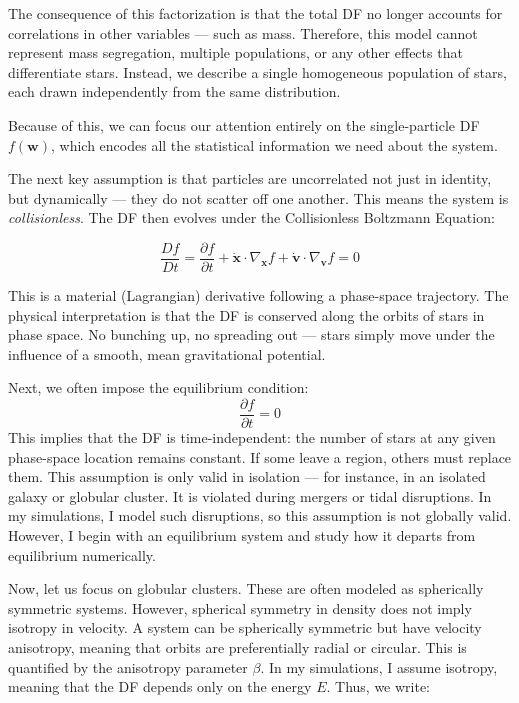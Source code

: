         The consequence of this factorization is that the total DF no longer accounts for correlations in other variables — such as mass. Therefore, this model cannot represent mass segregation, multiple populations, or any other effects that differentiate stars. Instead, we describe a single homogeneous population of stars, each drawn independently from the same distribution.

        Because of this, we can focus our attention entirely on the single-particle DF \( f(\mathbf{w}) \), which encodes all the statistical information we need about the system.

        The next key assumption is that particles are uncorrelated not just in identity, but dynamically — they do not scatter off one another. This means the system is \textit{collisionless}. The DF then evolves under the Collisionless Boltzmann Equation:

        \begin{equation}
        \frac{Df}{Dt} = \frac{\partial f}{\partial t} + \dot{\mathbf{x}} \cdot \nabla_{\mathbf{x}} f + \dot{\mathbf{v}} \cdot \nabla_{\mathbf{v}} f = 0
        \end{equation}

        This is a material (Lagrangian) derivative following a phase-space trajectory. The physical interpretation is that the DF is conserved along the orbits of stars in phase space. No bunching up, no spreading out — stars simply move under the influence of a smooth, mean gravitational potential.

        Next, we often impose the equilibrium condition:
        \[
        \frac{\partial f}{\partial t} = 0
        \]
        This implies that the DF is time-independent: the number of stars at any given phase-space location remains constant. If some leave a region, others must replace them. This assumption is only valid in isolation — for instance, in an isolated galaxy or globular cluster. It is violated during mergers or tidal disruptions. In my simulations, I model such disruptions, so this assumption is not globally valid. However, I begin with an equilibrium system and study how it departs from equilibrium numerically.

        Now, let us focus on globular clusters. These are often modeled as spherically symmetric systems. However, spherical symmetry in density does not imply isotropy in velocity. A system can be spherically symmetric but have velocity anisotropy, meaning that orbits are preferentially radial or circular. This is quantified by the anisotropy parameter \( \beta \). In my simulations, I assume isotropy, meaning that the DF depends only on the energy \( E \). Thus, we write:

